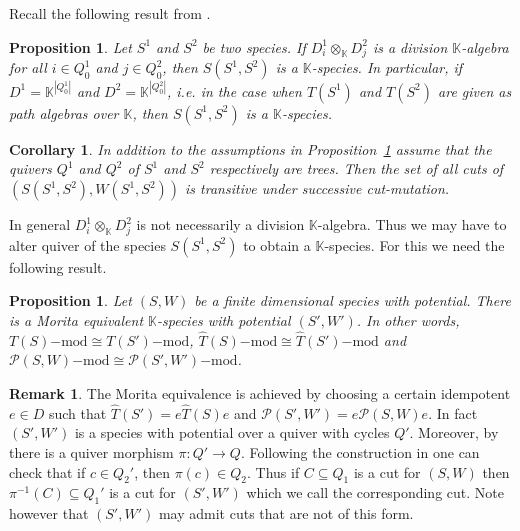 \documentclass[a4paper, reqno]{amsart}
\newtheorem{myprop}[mythm]{Proposition}
\newtheorem{mycor}[mythm]{Corollary}
\theoremstyle{definition}
\newtheorem{myrem}[mythm]{Remark}
\newcommand{\K}{\mathbb{K}}
\begin{document}
Recall the following result from \cite{soderberg2024mutation}.

\begin{myprop}\cite[Proposition~3.32]{soderberg2024mutation}\label{proposition - product is division alg}
	Let $S^1$ and $S^2$ be two species. If $D^1_i\otimes_\K D^2_j$ is a division $\K$-algebra for all $i\in Q^1_0$ and $j\in Q^2_0$, then $S(S^1, S^2)$ is a $\K$-species. In particular, if $D^1 = \K^{|Q^1_0|}$ and $D^2 = \K^{|Q^2_0|}$, i.e. in the case when $T(S^1)$ and $T(S^2)$ are given as path algebras over $\K$, then $S(S^1, S^2)$ is a $\K$-species.
\end{myprop}

\begin{mycor}
	In addition to the assumptions in Proposition~\ref{proposition - product is division alg} assume that the quivers $Q^1$ and $Q^2$ of $S^1$ and $S^2$ respectively are trees. Then the set of all cuts of $(S(S^1, S^2), W(S^1, S^2))$ is transitive under successive cut-mutation.
\end{mycor}

In general $D^1_i\otimes_\K D^2_j$ is not necessarily a division $\K$-algebra. Thus we may have to alter quiver of the species $S(S^1, S^2)$ to obtain a $\K$-species. For this we need the following result.

\begin{myprop}\label{proposition - morita equivalent k-species}\cite[Proposition 3.24]{soderberg2024mutation}
	Let $(S, W)$ be a finite dimensional species with potential. There is a Morita equivalent $\K$-species with potential $(S', W')$. In other words, $T(S)\mathrm{-mod}\cong T(S')\mathrm{-mod}$, $\widehat{T}(S)\mathrm{-mod}\cong \widehat{T}(S')\mathrm{-mod}$ and $\mathcal{P}(S, W)\mathrm{-mod}\cong \mathcal{P}(S', W')\mathrm{-mod}$. 
\end{myprop}

\begin{myrem}\label{remark - morita equiv given by a idemp e}
	The Morita equivalence is achieved by choosing a certain idempotent $e\in D$ such that $\widehat{T}(S') = e\widehat{T}(S)e$ and $\mathcal{P}(S', W') = e\mathcal{P}(S, W)e$. In fact $(S', W')$ is a species with potential over a quiver with cycles $Q'$. Moreover, by \cite[Remark 3.6]{soderberg2024mutation} there is a quiver morphism $\pi: Q' \to Q$. Following the construction in \cite[Lemma 3.4]{soderberg2024mutation} one can check that if $c\in Q_2'$, then $\pi(c)\in Q_2$. Thus if $C\subseteq Q_1$ is a cut for $(S, W)$ then $\pi^{-1}(C)\subseteq Q_1'$ is a cut for $(S', W')$ which we call the corresponding cut. Note however that $(S', W')$ may admit cuts that are not of this form.
\end{myrem}
\end{document}
